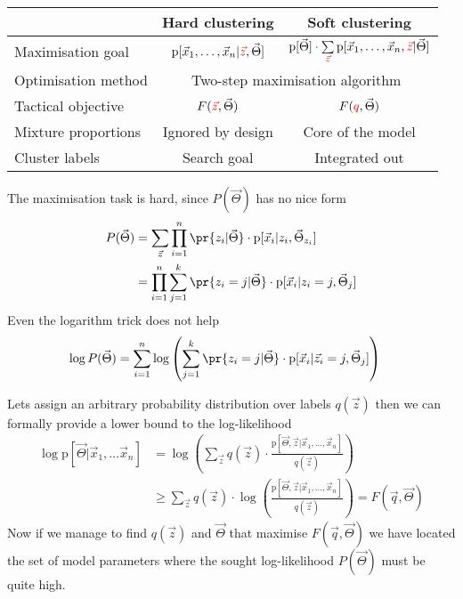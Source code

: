 \documentclass[landscape,footrule]{foils}
\newcommand{\pd}[1]{\mathrm{p}[#1]}
\begin{document}

\hspace*{-0.3cm}
\begin{tabular}{|l|c|c|}
\hline
& Hard clustering & Soft clustering\\
\hline
Maximisation goal \rule[-0.75cm]{0cm}{2cm}
& $\pd{\vec{x}_1,\ldots,\vec{x}_n|\textcolor{red}{\vec{z}},\vec{\Theta}}$
& \cellcolor{green!25}
$\pd{\vec{\Theta}}\cdot
  \sum\limits_{\textcolor{red}{\vec{z}}}\pd{\vec{x}_1,\ldots,\vec{x}_n,\textcolor{red}{\vec{z}}|\vec{\Theta}}$\\
\hline
Optimisation method \rule[-0.75cm]{0cm}{2cm}\hspace*{-1cm}
& \multicolumn{2}{|c|}{\cellcolor{red!25} Two-step maximisation algorithm}\\
\hline
Tactical objective\rule[-0.75cm]{0cm}{2cm}
& $F(\textcolor{red}{\vec{z}},\vec{\Theta})$
&  \cellcolor{red!25} $F(\textcolor{red}{q},\vec{\Theta})$\\
\hline
Mixture proportions \rule[-0.75cm]{0cm}{2cm}
& Ignored by design
&  \cellcolor{green!25} Core of the model\\
\hline 
Cluster labels \rule[-0.75cm]{0cm}{2cm}
& Search goal
&  \cellcolor{green!25} Integrated out\\
\hline 
\end{tabular}


The maximisation task is hard, since $P(\vec{\Theta})$ has no nice form 
\begin{align*}
P(\vec{\Theta})&=\sum_{\vec{z}}\prod_{i=1}^n\pr{z_i|\vec{\Theta}}\cdot
\pd{\vec{x}_i|z_i,\vec{\Theta}_{z_i}}\\
&=\prod_{i=1}^n\sum_{j=1}^k\pr{z_i=j|\vec{\Theta}}\cdot
\pd{\vec{x}_i|z_i=j,\vec{\Theta}_{j}}
\end{align*}
Even the logarithm trick does not help
\begin{align*}
\log P(\vec{\Theta})&=
\sum_{i=1}^n\log\left(\sum_{j=1}^k\pr{z_i=j|\vec{\Theta}}\cdot
\pd{\vec{x}_i|\vec{z}_i=j,\vec{\Theta}_{j}}\right)
\end{align*}


Lets assign an arbitrary probability distribution over labels $q(\vec{z})$ then we can formally provide a lower bound to the log-likelihood
\begin{align*}
\log \pd{\vec{\Theta}|\vec{x}_1,\ldots\vec{x}_n}%
&=\log\left(\sum_{\vec{z}}q(\vec{z})\cdot\frac{\pd{\vec{\Theta}, \vec{z}|\vec{x}_1,\ldots,\vec{x}_n}}{q(\vec{z})}\right)\\
&\geq \sum_{\vec{z}}q(\vec{z})\cdot\log\left(\frac{\pd{\vec{\Theta},\vec{z}|\vec{x}_1,\ldots,\vec{x}_n}}{q(\vec{z})}\right)=F(\vec{q},\vec{\Theta})
\end{align*}
Now if we manage to find $q(\vec{z})$ and $\vec{\Theta}$ that maximise $F(\vec{q},\vec{\Theta})$ we have located the set of model parameters where the sought log-likelihood $P(\vec{\Theta})$ must be quite high.
\end{document}
